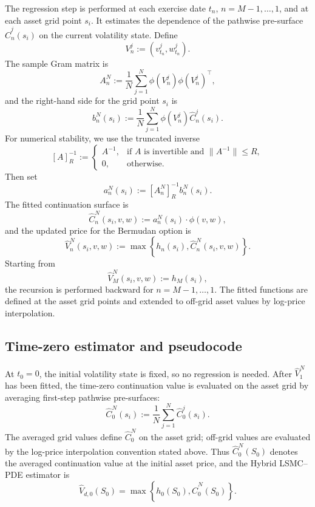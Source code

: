 \documentclass[pdflatex,sn-mathphys-num]{sn-jnl}
\theoremstyle{thmstyleone}%
\theoremstyle{thmstylethree}%
\theoremstyle{thmstyletwo}%
\begin{document}
The regression step is performed at each exercise date $t_n$,
$n=M-1,\ldots,1$, and at each asset grid point $s_i$. It estimates the
dependence of the pathwise pre-surface $\widehat C_n^j(s_i)$ on the current
volatility state. Define
$$
V_n^j:=(v_{t_n}^j,w_{t_n}^j).
$$
The sample Gram matrix is
$$
A_n^N
:=
\frac1N\sum_{j=1}^N
\phi(V_n^j)\phi(V_n^j)^\top,
$$
and the right-hand side for the grid point $s_i$ is
$$
b_n^N(s_i)
:=
\frac1N\sum_{j=1}^N
\phi(V_n^j)\widehat C_n^j(s_i).
$$
For numerical stability, we use the truncated inverse
\begin{equation}\label{eq:estimated_coeff}
[A]^{-1}_R
:=
\begin{cases}
A^{-1}, & \text{if $A$ is invertible and }\|A^{-1}\|\le R,\\
0,  & \text{otherwise.}
\end{cases}
\end{equation}
Then set
\begin{equation}
a_n^N(s_i):=[A_n^N]^{-1}_R b_n^N(s_i).
\label{eq:lsq}
\end{equation}
The fitted continuation surface is
$$
\widehat C_n^N(s_i,v,w)
:=
a_n^N(s_i)\cdot\phi(v,w),
$$
and the updated price for the Bermudan option is
$$
\widehat V_n^N(s_i,v,w)
:=
\max\left\{
h_n(s_i),
\widehat C_n^N(s_i,v,w)
\right\}.
$$
Starting from
$$
\widehat V_M^N(s_i,v,w):=h_M(s_i),
$$
the recursion is performed backward for $n=M-1,\ldots,1$. The fitted functions
are defined at the asset grid points and extended to off-grid asset values by
log-price interpolation.

\subsection{Time-zero estimator and pseudocode}
At $t_0=0$, the initial volatility state is fixed, so no regression is needed. After $\widehat V_1^N$ has been fitted, the time-zero
continuation value is evaluated on the asset grid by averaging first-step
pathwise pre-surfaces:
$$
\widehat C_0^N(s_i)
:=
\frac1N
\sum_{j=1}^{N}
\widehat C_0^j(s_i).
$$
The averaged grid values define $\widehat C_0^N$ on the asset grid; off-grid
values are evaluated by the log-price interpolation convention stated above.
Thus $\widehat C_0^N(S_0)$ denotes the averaged continuation value at the
initial asset price, and the Hybrid LSMC--PDE estimator is
\begin{equation}\label{eq:hybrid_est}
\widehat V_{d,0}(S_0)
=
\max\left\{
h_0(S_0),
\widehat C_0^N(S_0)
\right\}.
\end{equation}
\end{document}
